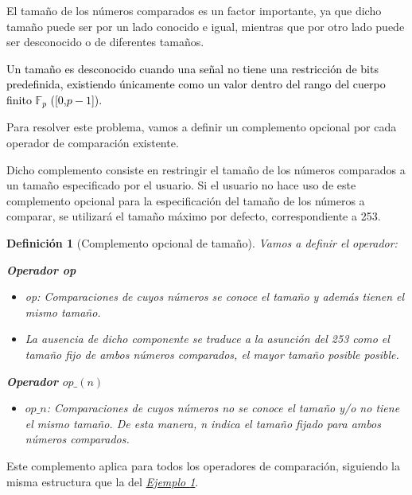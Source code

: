 \documentclass[a4paper,12pt]{report}
\newtheorem{definicion}{Definición}
\begin{document}
	\noindent El tamaño de los números comparados es un factor importante, ya que dicho tamaño puede ser por un lado conocido e igual, mientras que por otro lado puede ser desconocido o de diferentes tamaños.
	
	\vspace{0.2cm}    
	\noindent \textcolor{black}{Un tamaño es desconocido cuando una señal no tiene una restricción de bits predefinida, existiendo únicamente como un valor dentro del rango del cuerpo finito $\mathbb{F}_p$ ([0,$p-1$]). }
	
	\vspace{0.2cm}    
	\noindent Para resolver este problema, vamos a definir un complemento opcional por cada operador de comparación existente.
	
	\vspace{0.2cm}    
	\noindent Dicho complemento consiste en restringir el tamaño de los números comparados a un tamaño especificado por el usuario. Si el usuario no hace uso de este complemento opcional para la especificación del tamaño de los números a comparar, se utilizará el tamaño máximo por defecto, correspondiente a 253.
	
	\vspace{0.2cm}    
	
	\begin{definicion}[Complemento opcional de tamaño] Vamos a definir el operador: 
		
		\noindent \textbf{Operador \textit{op}}
		\begin{itemize}
			\item \textit{op}: Comparaciones de cuyos números se conoce el tamaño y además tienen el mismo tamaño.
			\item La ausencia de dicho componente se traduce a la asunción del 253 como el tamaño fijo de ambos números comparados, el mayor tamaño posible posible.
		\end{itemize}
		
		\noindent \textbf{Operador $op\_(n)$}
		\begin{itemize}
			\item $op\_{n}$: Comparaciones de cuyos números no se conoce el tamaño y/o no tiene el mismo tamaño. De esta manera, n indica el tamaño fijado para ambos números comparados.
		\end{itemize}
		
		\label{ex:complemento-opc-tamano}
	\end{definicion}
	
	\vspace{0.2cm}    
	\noindent Este complemento aplica para todos los operadores de comparación, siguiendo la misma estructura que la del \hyperref[ex:complemento-opc-tamano]{\textit{Ejemplo  \ref{ex:complemento-opc-tamano}}}.
	
\end{document}
